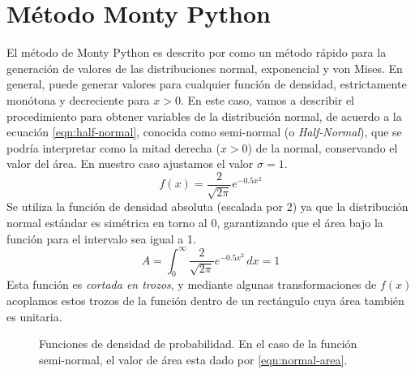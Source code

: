 \section{Método Monty Python}
El método de Monty Python es descrito por \parencite{Marsaglia-MontyPython} como un método rápido para la generación de valores de las distribuciones normal, exponencial y von Mises.
En general, puede generar valores para cualquier función de densidad, estrictamente monótona y decreciente para $x>0$.
En este caso, vamos a describir el procedimiento para obtener variables de la distribución normal, de acuerdo a la ecuación \eqref{eqn:half-normal}, conocida como semi-normal (o \textit{Half-Normal}), que se podría interpretar como la mitad derecha ($x>0$)
de la normal, conservando el valor del área. En nuestro caso ajustamos el valor $\sigma = 1$.
\begin{equation}
    f(x) = \frac{2}{\sqrt{2\pi}}e^{-0.5x^2}
    \label{eqn:half-normal}
\end{equation}
Se utiliza la función de densidad absoluta (escalada por 2) ya que la distribución normal estándar es simétrica en torno al $0$,
garantizando que el área bajo la función para el intervalo sea igual a 1.
\begin{equation}
    \displaystyle A = \int_0^\infty \frac{2}{\sqrt{2\pi}}e^{-0.5x^2} \, dx = 1
    \label{eqn:normal-area}
\end{equation}
Esta función es \textit{cortada en trozos}, y mediante algunas transformaciones de $f(x)$ acoplamos estos trozos de la función dentro de un rectángulo
cuya área también es unitaria.
\begin{figure}[ht!]
    \centering
    \caption{Funciones de densidad de probabilidad. En el caso de la función semi-normal, el valor de área esta dado por \eqref{eqn:normal-area}.}
    \label{fig:normal-1}
\end{figure}
